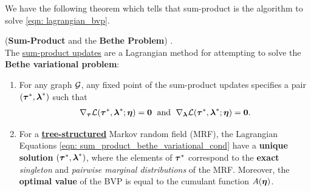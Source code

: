 \documentclass[11pt]{article}
\begin{document}
We have the following theorem which tells that sum-product is the algorithm to solve \eqref{eqn: lagrangian_bvp}.
\begin{theorem} (\textbf{Sum-Product} and the \textbf{Bethe Problem}) \citep{wainwright2008graphical}. \\
The \underline{sum-product updates} are a Lagrangian method for attempting to solve the \textbf{Bethe variational problem}:
\begin{enumerate}
\item For any graph ${\mathcal G}$, any fixed point of the sum-product updates specifies a pair $(\boldsymbol{\tau}^{*}, \boldsymbol{\lambda}^{*})$ such that
\begin{align}
\nabla_{\boldsymbol{\tau}}{{\mathcal L}(\boldsymbol{\tau}^{*}, \boldsymbol{\lambda}^{*}; \boldsymbol{\eta})} = \boldsymbol{0} \;\text{ and } \;
\nabla_{\boldsymbol{\lambda}}{{\mathcal L}(\boldsymbol{\tau}^{*}, \boldsymbol{\lambda}^{*}; \boldsymbol{\eta})} = \boldsymbol{0}. \label{eqn: sum_product_bethe_variational_cond}
\end{align}

\item For a \underline{\textbf{tree-structured}} Markov random field (MRF), the Lagrangian Equations \eqref{eqn: sum_product_bethe_variational_cond} have a \textbf{unique solution} $(\boldsymbol{\tau}^{*}, \boldsymbol{\lambda}^{*})$,  where the elements of $\boldsymbol{\tau}^{*}$ correspond to the \textbf{exact} \emph{singleton} and \emph{pairwise marginal distributions} of the MRF. Moreover, the \textbf{optimal value} of the BVP is equal to the cumulant function $A(\boldsymbol{\eta})$.
\end{enumerate}
\end{theorem}
\end{document}
